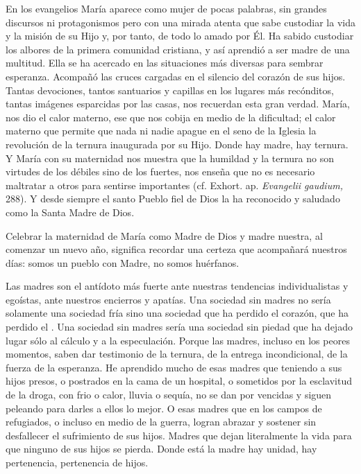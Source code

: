En los evangelios María aparece como mujer de pocas palabras, sin grandes discursos ni protagonismos pero con una mirada atenta que sabe custodiar la vida y la misión de su Hijo y, por tanto, de todo lo amado por Él. Ha sabido custodiar los albores de la primera comunidad cristiana, y así aprendió a ser madre de una multitud. Ella se ha acercado en las situaciones más diversas para sembrar esperanza. Acompañó las cruces cargadas en el silencio del corazón de sus hijos. Tantas devociones, tantos santuarios y capillas en los lugares más recónditos, tantas imágenes esparcidas por las casas, nos recuerdan esta gran verdad. María, nos dio el calor materno, ese que nos cobija en medio de la dificultad; el calor materno que permite que nada ni nadie apague en el seno de la Iglesia la revolución de la ternura inaugurada por su Hijo. Donde hay madre, hay ternura. Y María con su maternidad nos muestra que la humildad y la ternura no son virtudes de los débiles sino de los fuertes, nos enseña que no es necesario maltratar a otros para sentirse importantes (cf. Exhort. ap. \emph{Evangelii gaudium,} 288). Y desde siempre el santo Pueblo fiel de Dios la ha reconocido y saludado como la Santa Madre de Dios.

Celebrar la maternidad de María como Madre de Dios y madre nuestra, al comenzar un nuevo año, significa recordar una certeza que acompañará nuestros días: somos un pueblo con Madre, no somos huérfanos.

Las madres son el antídoto más fuerte ante nuestras tendencias individualistas y egoístas, ante nuestros encierros y apatías. Una sociedad sin madres no sería solamente una sociedad fría sino una sociedad que ha perdido el corazón, que ha perdido el . Una sociedad sin madres sería una sociedad sin piedad que ha dejado lugar sólo al cálculo y a la especulación. Porque las madres, incluso en los peores momentos, saben dar testimonio de la ternura, de la entrega incondicional, de la fuerza de la esperanza. He aprendido mucho de esas madres que teniendo a sus hijos presos, o postrados en la cama de un hospital, o sometidos por la esclavitud de la droga, con frio o calor, lluvia o sequía, no se dan por vencidas y siguen peleando para darles a ellos lo mejor. O esas madres que en los campos de refugiados, o incluso en medio de la guerra, logran abrazar y sostener sin desfallecer el sufrimiento de sus hijos. Madres que dejan literalmente la vida para que ninguno de sus hijos se pierda. Donde está la madre hay unidad, hay pertenencia, pertenencia de hijos.

